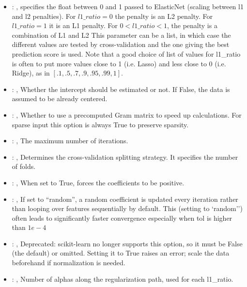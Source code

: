 \begin{itemize}
    \item {}: ,
      specifies the                                                  float between 0 and 1 passed to
      ElasticNet (scaling between l1 and l2 penalties).
      For $l1\_ratio = 0$ the penalty is an L2 penalty. For $l1\_ratio = 1$ it is
      an L1 penalty. For $0 < l1\_ratio < 1$, the penalty is a combination of L1
      and L2 This parameter can be a list, in which case the different values
      are tested by cross-validation and the one giving the best prediction score
      is used. Note that a good choice of list of values for l1\_ratio is often to
      put more values close to 1 (i.e. Lasso) and less close to 0 (i.e. Ridge),
      as in $[.1, .5, .7, .9, .95, .99, 1]$.

    \item {}: ,
      Whether the intercept should be estimated or not. If False,
      the data is assumed to be already centered.

    \item {}: ,
      Whether to use a precomputed Gram matrix to speed up calculations.
      For sparse input this option is always True to preserve sparsity.

    \item {}: ,
      The maximum number of iterations.

    \item {}: ,
      Determines the cross-validation splitting strategy.
      It specifies the number of folds.

    \item {}: ,
      When set to True, forces the coefficients to be positive.

    \item {}: ,
      If set to ``random'', a random coefficient is updated every iteration
      rather than looping over features sequentially by default. This (setting to `random'')
      often leads to significantly faster convergence especially when tol is higher than $1e-4$

    \item {}: ,
      Deprecated: scikit-learn no longer supports this option, so it must be False (the default) or
      omitted.                                                  Setting it to True raises an error;
      scale the data beforehand if normalization is needed.

    \item {}: ,
      Number of alphas along the regularization path,
      used for each l1\_ratio.
  \end{itemize}


